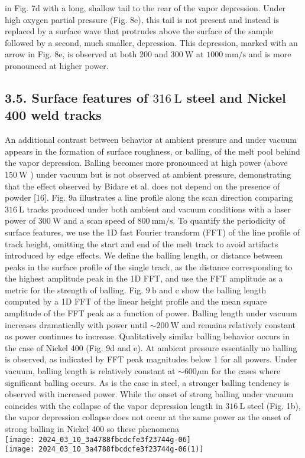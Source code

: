 \documentclass[10pt]{article}
\begin{document}
in Fig. 7d with a long, shallow tail to the rear of the vapor depression. Under high oxygen partial pressure (Fig. 8e), this tail is not present and instead is replaced by a surface wave that protrudes above the surface of the sample followed by a second, much smaller, depression. This depression, marked with an arrow in Fig. 8e, is observed at both 200 and $300 \mathrm{~W}$ at $1000 \mathrm{~mm} / \mathrm{s}$ and is more pronounced at higher power.

\subsection*{3.5. Surface features of $316 \mathrm{~L}$ steel and Nickel 400 weld tracks}
An additional contrast between behavior at ambient pressure and under vacuum appears in the formation of surface roughness, or balling, of the melt pool behind the vapor depression. Balling becomes more pronounced at high power (above $150 \mathrm{~W}$ ) under vacuum but is not observed at ambient pressure, demonstrating that the effect observed by Bidare et al. does not depend on the presence of powder [16]. Fig. 9a illustrates a line profile along the scan direction comparing $316 \mathrm{~L}$ tracks produced under both ambient and vacuum conditions with a laser power of $300 \mathrm{~W}$ and a scan speed of $800 \mathrm{~mm} / \mathrm{s}$. To quantify the periodicity of surface features, we use the 1D fast Fourier transform (FFT) of the line profile of track height, omitting the start and end of the melt track to avoid artifacts introduced by edge effects. We define the balling length, or distance between peaks in the surface profile of the single track, as the distance corresponding to the highest amplitude peak in the 1D FFT, and use the FFT amplitude as a metric for the strength of balling. Fig. $9 \mathrm{~b}$ and $\mathrm{c}$ show the balling length computed by a 1D FFT of the linear height profile and the mean square amplitude of the FFT peak as a function of power. Balling length under vacuum increases dramatically with power until $\sim 200 \mathrm{~W}$ and remains relatively constant as power continues to increase. Qualitatively similar balling behavior occurs in the case of Nickel 400 (Fig. 9d and e). At ambient pressure essentially no balling is observed, as indicated by FFT peak magnitudes below 1 for all powers. Under vacuum, balling length is relatively constant at $\sim 600 \mu \mathrm{m}$ for the cases where significant balling occurs. As is the case in steel, a stronger balling tendency is observed with increased power. While the onset of strong balling under vacuum coincides with the collapse of the vapor depression length in $316 \mathrm{~L}$ steel (Fig. 1b), the vapor depression collapse does not occur at the same power as the onset of strong balling in Nickel 400 so these phenomena\\
\texttt{[image: 2024\_03\_10\_3a4788fbcdcfe3f23744g-06]}\\
\texttt{[image: 2024\_03\_10\_3a4788fbcdcfe3f23744g-06(1)]}
\end{document}
